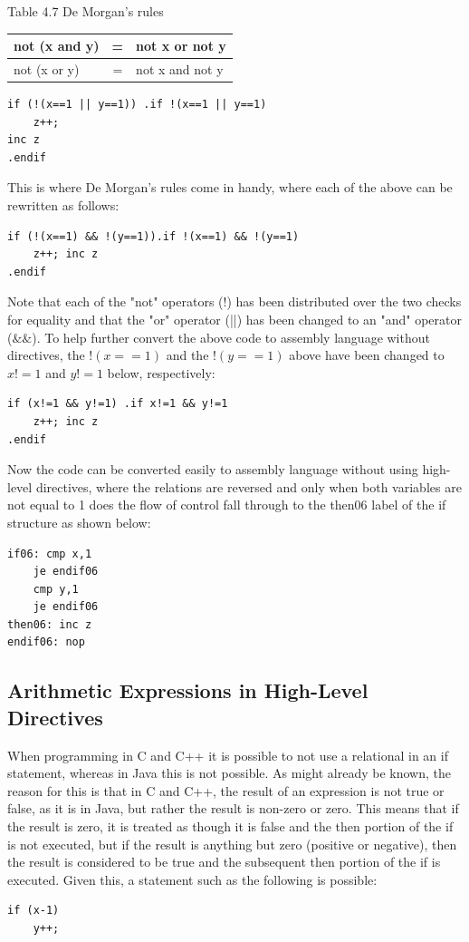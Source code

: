 \documentclass[10pt]{book}
\begin{document}
Table 4.7 De Morgan's rules
\begin{center}
\begin{tabular}{lcl}
\hline
not (x and y) & = & not x or not y \\
\hline
not (x or y) & = & not x and not y \\
\hline
\end{tabular}
\end{center}

\begin{verbatim}
if (!(x==1 || y==1)) .if !(x==1 || y==1)
    z++;
inc z
.endif
\end{verbatim}

This is where De Morgan's rules come in handy, where each of the above can be rewritten as follows:

\begin{verbatim}
if (!(x==1) && !(y==1)).if !(x==1) && !(y==1)
    z++; inc z
.endif
\end{verbatim}

Note that each of the "not" operators (!) has been distributed over the two checks for equality and that the "or" operator (||) has been changed to an "and" operator ($\&\&$). To help further convert the above code to assembly language without directives, the $!(x==1)$ and the $!(y==1)$ above have been changed to $x!=1$ and $y!=1$ below, respectively:

\begin{verbatim}
if (x!=1 && y!=1) .if x!=1 && y!=1
    z++; inc z
.endif
\end{verbatim}

Now the code can be converted easily to assembly language without using high-level directives, where the relations are reversed and only when both variables are not equal to 1 does the flow of control fall through to the then06 label of the if structure as shown below:

\begin{verbatim}
if06: cmp x,1
    je endif06
    cmp y,1
    je endif06
then06: inc z
endif06: nop
\end{verbatim}

\subsection{Arithmetic Expressions in High-Level Directives}
When programming in C and C++ it is possible to not use a relational in an if statement, whereas in Java this is not possible. As might already be known, the reason for this is that in C and C++, the result of an expression is not true or false, as it is in Java, but rather the result is non-zero or zero. This means that if the result is zero, it is treated as though it is false and the then portion of the if is not executed, but if the result is anything but zero (positive or negative), then the result is considered to be true and the subsequent then portion of the if is executed. Given this, a statement such as the following is possible:
\begin{verbatim}
if (x-1)
    y++;
\end{verbatim}
\end{document}
